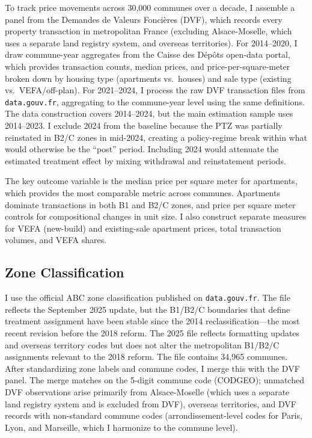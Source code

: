 \documentclass[12pt]{article}
\begin{document}
To track price movements across 30,000 communes over a decade, I assemble a panel from the Demandes de Valeurs Fonci\`{e}res (DVF), which records every property transaction in metropolitan France (excluding Alsace-Moselle, which uses a separate land registry system, and overseas territories). For 2014--2020, I draw commune-year aggregates from the Caisse des D\'{e}p\^{o}ts open-data portal, which provides transaction counts, median prices, and price-per-square-meter broken down by housing type (apartments vs.\ houses) and sale type (existing vs.\ VEFA/off-plan). For 2021--2024, I process the raw DVF transaction files from \texttt{data.gouv.fr}, aggregating to the commune-year level using the same definitions. The data construction covers 2014--2024, but the main estimation sample uses 2014--2023. I exclude 2024 from the baseline because the PTZ was partially reinstated in B2/C zones in mid-2024, creating a policy-regime break within what would otherwise be the ``post'' period. Including 2024 would attenuate the estimated treatment effect by mixing withdrawal and reinstatement periods.

The key outcome variable is the median price per square meter for apartments, which provides the most comparable metric across communes. Apartments dominate transactions in both B1 and B2/C zones, and price per square meter controls for compositional changes in unit size. I also construct separate measures for VEFA (new-build) and existing-sale apartment prices, total transaction volumes, and VEFA shares.

\subsection{Zone Classification}

I use the official ABC zone classification published on \texttt{data.gouv.fr}. The file reflects the September 2025 update, but the B1/B2/C boundaries that define treatment assignment have been stable since the 2014 reclassification---the most recent revision before the 2018 reform. The 2025 file reflects formatting updates and overseas territory codes but does not alter the metropolitan B1/B2/C assignments relevant to the 2018 reform. The file contains 34,965 communes. After standardizing zone labels and commune codes, I merge this with the DVF panel. The merge matches on the 5-digit commune code (CODGEO); unmatched DVF observations arise primarily from Alsace-Moselle (which uses a separate land registry system and is excluded from DVF), overseas territories, and DVF records with non-standard commune codes (arrondissement-level codes for Paris, Lyon, and Marseille, which I harmonize to the commune level).
\end{document}
